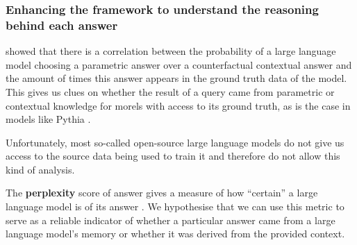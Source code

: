 
\subsubsection{Enhancing the framework to understand the reasoning behind each answer}

 showed that there is a correlation between the probability of a large language model choosing a parametric answer over a counterfactual contextual answer and the amount of times this answer appears in the ground truth data of the model.
This gives us clues on whether the result of a query came from parametric or contextual knowledge for morels with access to its ground truth, as is the case in models like Pythia \citep{pythia}.

Unfortunately, most so-called open-source large language models do not give us access to the source data being used to train it and therefore do not allow this kind of analysis.

The \textbf{perplexity} score of answer gives a measure of how ``certain'' a large language model is of its answer \citep{how_can_we_know}.
We hypothesise that we can use this metric to serve as a reliable indicator of whether a particular answer came from a large language model's memory or whether it was derived from the provided context.
